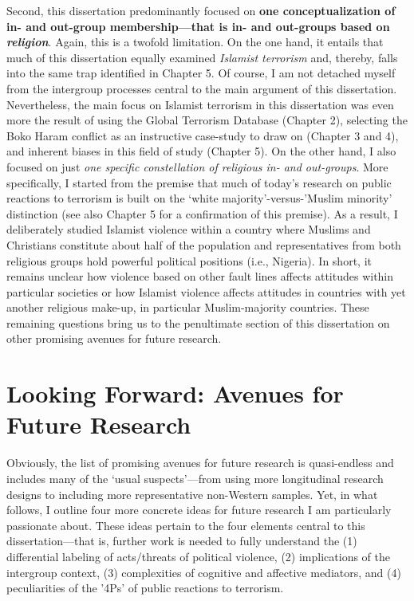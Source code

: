 Second, this dissertation predominantly focused on \textbf{one conceptualization of in- and out-group membership---that is in- and out-groups based on \textit{religion}}. Again, this is a twofold limitation. On the one hand, it entails that much of this dissertation equally examined \textit{Islamist terrorism} and, thereby, falls into the same trap identified in Chapter 5. Of course, I am not detached myself from the intergroup processes central to the main argument of this dissertation. Nevertheless, the main focus on Islamist terrorism in this dissertation was even more the result of using the Global Terrorism Database (Chapter 2), selecting the Boko Haram conflict as an instructive case-study to draw on (Chapter 3 and 4), and inherent biases in this field of study (Chapter 5). On the other hand, I also focused on just \textit{one specific constellation of religious in- and out-groups}. More specifically, I started from the premise that much of today's research on public reactions to terrorism is built on the `white majority'-versus-'Muslim minority' distinction (see also Chapter 5 for a confirmation of this premise). As a result, I deliberately studied Islamist violence within a country where Muslims and Christians constitute about half of the population and representatives from both religious groups hold powerful political positions (i.e., Nigeria). %
In short, it remains unclear how violence based on other fault lines affects attitudes within particular societies or how Islamist violence affects attitudes in countries with yet another religious make-up, in particular Muslim-majority countries. These remaining questions bring us to the penultimate section of this dissertation on other promising avenues for future research.


\newpage
\section{Looking Forward: Avenues for Future Research}
\label{sec:63}
Obviously, the list of promising avenues for future research is quasi-endless and includes many of the `usual suspects'---from using more longitudinal research designs to including more representative non-Western samples. Yet, in what follows, I outline four more concrete ideas for future research I am particularly passionate about. These ideas pertain to the four elements central to this dissertation---that is, further work is needed to fully understand the (1) differential labeling of acts/threats of political violence, (2) implications of the intergroup context, (3) complexities of cognitive and affective mediators, and (4) peculiarities of the '4Ps' of public reactions to terrorism.


